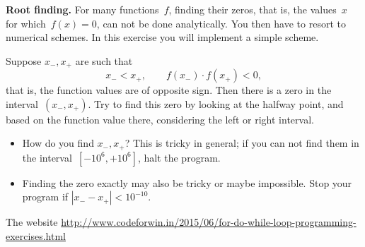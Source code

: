 \begin{exercise}
  \label{ex:rootfind}
  \textbf{Root finding.}
  For many functions~$f$, finding their zeros, that is, the values~$x$
  for which~$f(x)=0$, can not be done analytically. You then have to
  resort to numerical  schemes. In this
  exercise you will implement a simple scheme.

  Suppose $x_-,x_+$ are such that 
  \[ x_-<x_+,\qquad f(x_-)\cdot f(x_+)<0,\]
  that is, the function values are of opposite sign. Then
  there is a zero in the interval~$(x_-,x_+)$. Try to find this zero
  by looking at the halfway point, and based on the function value
  there, considering the left or right interval.
  \begin{itemize}
  \item How do you find $x_-,x_+$? This is tricky in general; if you
    can not find them in the interval~$[-10^6,+10^6]$, halt the program.
  \item Finding the zero exactly may also be tricky or maybe
    impossible. Stop your program if $|x_--x_+|<10^{-10}$.
  \end{itemize}
\end{exercise}

The website
\url{http://www.codeforwin.in/2015/06/for-do-while-loop-programming-exercises.html}
